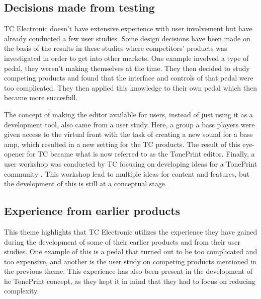 \subsection*{Decisions made from testing}
\label{App:ThemeDecisionsBasedOnTest}
TC Electronic doesn't have extensive experience with user involvement but have already conducted a few user studies. Some design decisions have been made on the basis of the results in these studies where competitors' products was investigated in order to get into other markets. One example involved a type of pedal, they weren't making themselves at the time. They then decided to study competing products and found that the interface and controls of that pedal were too complicated. They then applied this knowledge to their own pedal which then became more succesfull.
 
 The concept of making the editor available for users, instead of just using it as a development tool, also came from a user study. Here, a group a bass players were given access to the virtual front with the task of creating a new sound for a bass amp, which resulted in a new setting for the TC products. The result of this eye-opener for TC became what is now referred to as the TonePrint editor. Finally, a user workshop was conducted by TC focusing on developing ideas for a TonePrint community \parencite{PDF:BrugerWorkshopUserTonePrints}. This workshop lead to multiple ideas for content and features, but the development of this is still at a conceptual stage.
 
\subsection*{Experience from earlier products}
\label{App:ThemeExperienceFromEarlierProducts}
This theme highlights that TC Electronic utilizes the experience they have gained during the development of some of their earlier products and from their user studies. One example of this is a pedal that turned out to be too complicated and too expensive, and another is the user study on competing products mentioned in the previous theme. This experience has also been present in the development of he TonePrint concept, as they kept it in mind that they had to focus on reducing complexity.
 
